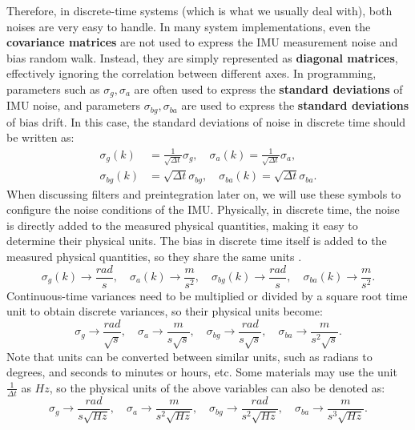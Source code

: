 Therefore, in discrete-time systems (which is what we usually deal with), both noises are very easy to handle. In many system implementations, even the \textbf{covariance matrices} are not used to express the IMU measurement noise and bias random walk. Instead, they are simply represented as \textbf{diagonal matrices}, effectively ignoring the correlation between different axes. In programming, parameters such as $\sigma_g, \sigma_a$ are often used to express the \textbf{standard deviations} of IMU noise, and parameters $\sigma_{bg}, \sigma_{ba}$ are used to express the \textbf{standard deviations} of bias drift. In this case, the standard deviations of noise in discrete time should be written as:
\begin{subequations}\label{eq:noise-std-dev}\label{eq:imu-noise-relationship}
	\begin{align}
		\sigma_{g}(k) &= \frac{1}{\sqrt{\Delta t}} \sigma_g , \quad	\sigma_{a}(k) = \frac{1}{\sqrt{\Delta t}} 
		\sigma_a, \\
		\sigma_{bg}(k) &= \sqrt{\Delta t} \sigma_{bg} , \quad 	\sigma_{ba}(k) = \sqrt{\Delta t} \sigma_{ba} .
	\end{align}
\end{subequations}
When discussing filters and preintegration later on, we will use these symbols to configure the noise conditions of the IMU. Physically, in discrete time, the noise is directly added to the measured physical quantities, making it easy to determine their physical units. The bias in discrete time itself is added to the measured physical quantities, so they share the same units \cite{Woodman2007}.
\begin{equation}\label{eq:physical-units}
	\sigma_g (k) \rightarrow \frac{rad}{s}, \quad \sigma_a(k) \rightarrow \frac{m}{s^2}, \quad 
	\sigma_{bg}(k) \rightarrow \frac{rad}{s}, \quad \sigma_{ba}(k) \rightarrow \frac{m}{s^2}.
\end{equation}
Continuous-time variances need to be multiplied or divided by a square root time unit to obtain discrete variances, so their physical units become:
\begin{equation}\label{eq:physical-units-continuous}
	\sigma_g  \rightarrow \frac{rad}{\sqrt{s}}, \quad \sigma_a \rightarrow \frac{m}{s \sqrt{s}}, \quad 
	\sigma_{bg} \rightarrow \frac{rad}{s \sqrt{s}}, \quad \sigma_{ba} \rightarrow \frac{m}{s^2 \sqrt{s}}.
\end{equation}
Note that units can be converted between similar units, such as radians to degrees, and seconds to minutes or hours, etc. Some materials may use the unit $\frac{1}{\Delta t}$ as $Hz$, so the physical units of the above variables can also be denoted as:
\begin{equation}\label{eq:physical-units-hertz}
	\sigma_g  \rightarrow \frac{rad}{s \sqrt{Hz}}, \quad \sigma_a \rightarrow \frac{m}{s^2 \sqrt{Hz}}, 
	\quad \sigma_{bg} \rightarrow \frac{rad}{s^2 \sqrt{Hz}}, \quad \sigma_{ba} \rightarrow \frac{m}{s^3 
		\sqrt{Hz}}.
\end{equation}

